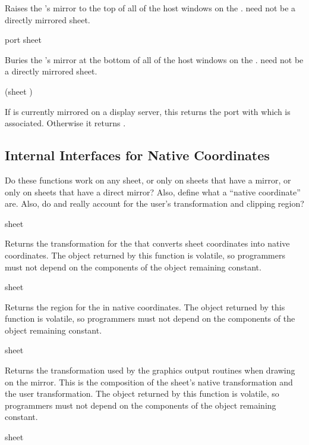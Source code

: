 Raises the  's mirror to the top of all of the host
windows on the  .   need not be a directly
mirrored sheet.

 {port sheet}

Buries the  's mirror at the bottom of all of the host
windows on the  .   need not be a directly
mirrored sheet.

 {(sheet )}

If  is currently mirrored on a display server, this returns the port
with which  is associated.  Otherwise it returns .


\subsection {Internal Interfaces for Native Coordinates}

 {Do these functions work on any sheet, or only on sheets that have
a mirror, or only on sheets that have a direct mirror?  Also, define what a
``native coordinate'' are.  Also, do  and
 really account for the user's transformation and
clipping region?}

 {sheet}

Returns the transformation for the   that converts sheet
coordinates into native coordinates.  The object returned by this function is
volatile, so programmers must not depend on the components of the object
remaining constant.

 {sheet}

Returns the region for the   in native coordinates.  The
object returned by this function is volatile, so programmers must not depend on
the components of the object remaining constant.

 {sheet}

Returns the transformation used by the graphics output routines when drawing on
the mirror.  This is the composition of the sheet's native transformation and
the user transformation.  The object returned by this function is volatile, so
programmers must not depend on the components of the object remaining constant.

 {sheet}

